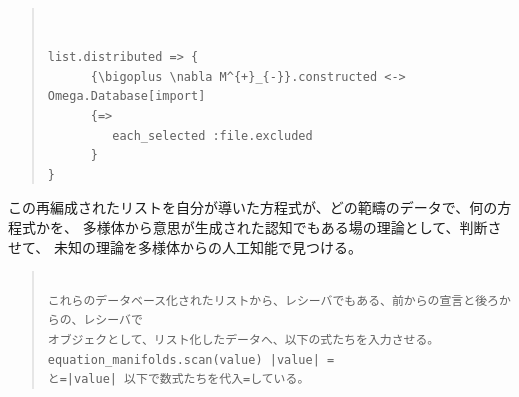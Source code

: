 \documentclass{jsarticle}
\begin{document}
\begin{quote}
\setlength{\baselineskip}{12pt}
\begin{verbatim}


list.distributed => {
      {\bigoplus \nabla M^{+}_{-}}.constructed <-> Omega.Database[import]                 
      {=>
         each_selected :file.excluded
      }
}
\end{verbatim}
\end{quote}

                      
この再編成されたリストを自分が導いた方程式が、どの範疇のデータで、何の方程式かを、
多様体から意思が生成された認知でもある場の理論として、判断させて、
未知の理論を多様体からの人工知能で見つける。

\begin{quote}
\setlength{\baselineskip}{12pt}
\begin{verbatim}

これらのデータベース化されたリストから、レシーバでもある、前からの宣言と後ろからの、レシーバで
オブジェクとして、リスト化したデータへ、以下の式たちを入力させる。equation_manifolds.scan(value) |value| = 
と=|value| 以下で数式たちを代入=している。
\end{verbatim}
\end{quote}
\end{document}
